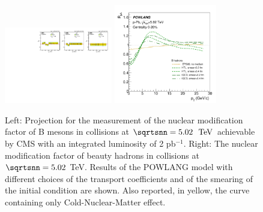 \begin{figure}[ht]
\centering
\includegraphics[trim=0 0 13cm 0,clip,width=0.42\textwidth]{hf/figures/cRpA_lumiTG_2000.pdf}
\includegraphics[width=0.4\textwidth]{hf/figures/Beauty-RpPb5TeV-HTLvsLat.pdf}
\caption{Left: Projection for the measurement of the nuclear modification factor of B mesons in \pPb collisions at $\sqrtsnn=5.02~\UTeV$ achievable by CMS with an integrated luminosity of 2 pb$^{-1}$.
Right: The nuclear modification factor of beauty hadrons in \pPb collisions at $\sqrtsnn=5.02$ TeV. Results of the POWLANG model with different choices of the transport coefficients and of the smearing of the initial condition are shown. Also reported, in yellow, the curve containing only Cold-Nuclear-Matter effect.}
\label{fig:POWLANG-small1}
\end{figure}
